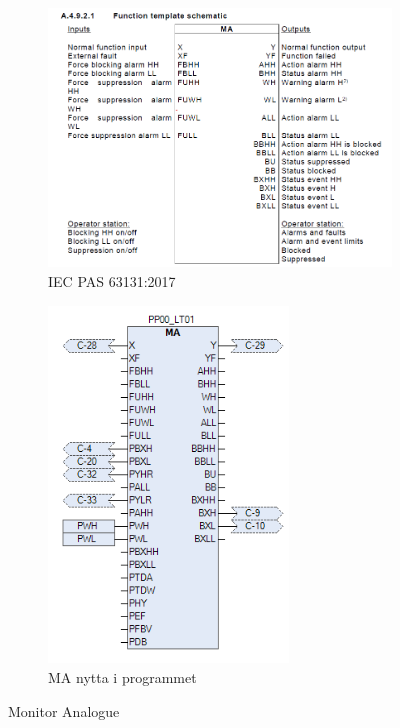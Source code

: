 \begin{figure}[htbp]
    \centering
    \begin{subfigure}[b]{0.49\textwidth}
        \centering
        \includegraphics[width=1\textwidth]{Bilder/MABlokkIEC.png}
        \caption{\gls{IEC} \gls{PAS} 63131:2017 \citep{MA}}\label{fig:Monitor Analogue blokk IEC}
    \end{subfigure}
    \hfill
    \begin{subfigure}[b]{0.49\textwidth}
        \centering
        \includegraphics[width=0.7\textwidth]{Bilder/MABlokkIProgrammet.png}
        \caption{MA nytta i programmet}\label{fig:Monitor Analogue blokk i programmet}
    \end{subfigure}
    \caption{Monitor Analogue}\label{fig:Monitor Analogue}
\end{figure}

